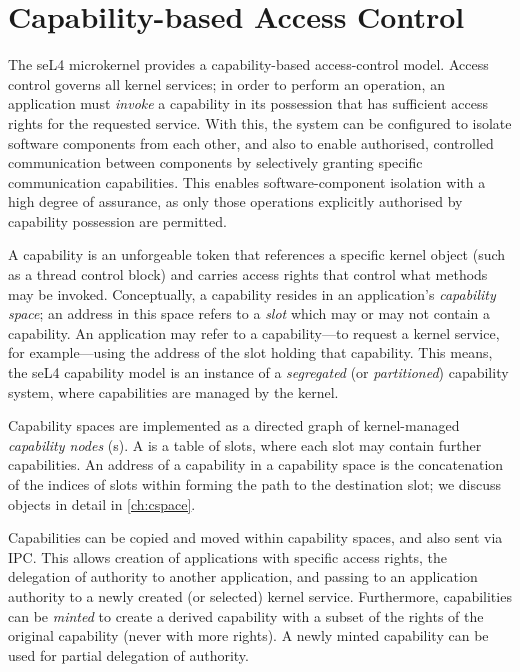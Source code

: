 \section{Capability-based Access Control}
\label{sec:cap-access-control}

The seL4 microkernel provides a capability-based access-control model.
Access control governs all kernel services; in order to perform an
operation, an application must \emph{invoke} a capability in its
possession that has sufficient access rights for the requested service.
With this, the system can be configured to isolate software components from
each other, and also to enable authorised, controlled communication
between components by selectively granting specific communication
capabilities.  This enables software-component isolation with a high
degree of assurance, as only those operations explicitly authorised by
capability possession are permitted.

A capability is an unforgeable token that references a specific kernel
object (such as a thread control block) and carries access rights that
control what methods may be invoked.
Conceptually, a capability resides in an application's \emph{capability
space}; an address in this space refers to a \emph{slot} which may or
may not contain a capability.  An application may refer to
a capability---to request a kernel service, for example---using the
address of the slot holding that capability.  This means, the seL4 
capability model is an instance of a \emph{segregated} (or \emph{partitioned})
capability system, where capabilities are managed by the kernel.

Capability spaces are implemented as a directed graph of kernel-managed
\emph{capability nodes} (s).  A  is a table of
slots, where each slot may contain further  capabilities. An
address of a capability in a capability space is the concatenation of the indices
of slots within  forming the path to the destination
slot; we discuss  objects in detail in \autoref{ch:cspace}.

Capabilities can be copied and moved within capability spaces, and
also sent via IPC. This allows creation of applications with specific
access rights, the delegation of authority to another application, and
passing to an application authority to a newly created (or selected)
kernel service. Furthermore, capabilities can be \emph{minted} to
create a derived capability with a subset of the rights of the
original capability (never with more rights). A newly minted
capability can be used for partial delegation of authority.

